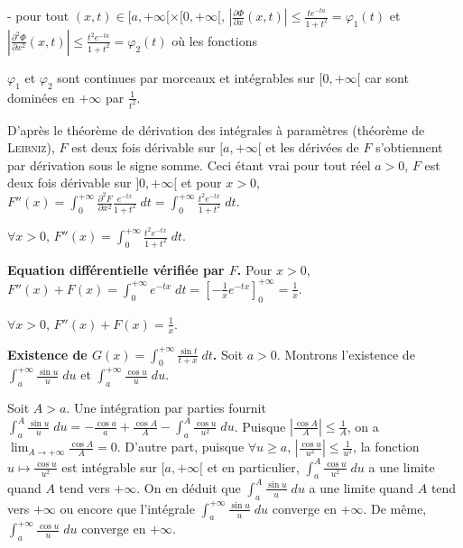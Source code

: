 {{- pour tout $(x,t)\in[a,+\infty[\times[0,+\infty[$, $\left| \frac{\partial \Phi}{\partial x}(x,t)\right|\leqslant \frac{te^{-ta}}{1+t^2}=\varphi_1(t)$ et  $\left| \frac{\partial^2\Phi}{\partial x^2}(x,t)\right|\leqslant \frac{t^2e^{-ta}}{1+t^2}=\varphi_2(t)$ où les fonctions 

$\varphi_1$ et $\varphi_2$ sont continues par morceaux et intégrables sur $[0,+\infty[$ car sont dominées en $+\infty$ par $ \frac{1}{t^2}$.
 
 
 

 
 
D'après le théorème de dérivation des intégrales à paramètres (théorème de \textsc{Leibniz}), $F$ est deux fois dérivable sur $[a,+\infty[$ et les dérivées de $F$ s'obtiennent par dérivation sous le signe somme. Ceci étant vrai pour tout réel $a>0$, $F$ est deux fois dérivable sur $]0,+\infty[$ et pour $x>0$, $F''(x)=\int_{0}^{+\infty} \frac{\partial^2F}{\partial x^2} \frac{e^{-tx}}{1+t^2}\;dt=\int_{0}^{+\infty} \frac{t^2e^{-tx}}{1+t^2}\;dt$.

\begin{center}
$\forall x>0$, $F''(x)=\int_{0}^{+\infty} \frac{t^2e^{-tx}}{1+t^2}\;dt$.
\end{center}

\textbf{Equation différentielle vérifiée par $F$.} Pour $x>0$, $F''(x)+F(x)=\int_{0}^{+\infty}e^{-tx}\;dt=\left[- \frac{1}{x}e^{-tx}\right]_0^{+\infty}= \frac{1}{x}$.

\begin{center}
$\forall x>0$, $F''(x)+F(x)= \frac{1}{x}$.
\end{center}

\textbf{Existence de $G(x)=\int_{0}^{+\infty} \frac{\sin t}{t+x}\;dt$.} Soit $a>0$. Montrons l'existence de $\int_{a}^{+\infty} \frac{\sin u}{u}\;du$ et $\int_{a}^{+\infty} \frac{\cos u}{u}\;du$.

Soit $A>a$. Une intégration par parties fournit $\int_{a}^{A} \frac{\sin u}{u}\;du=- \frac{\cos a}{a}+ \frac{\cos A}{A}-\int_{a}^{A} \frac{\cos u}{u^2}\;du$. Puisque $\left| \frac{\cos A}{A}\right|\leqslant \frac{1}{A}$, on a $\lim_{A \rightarrow +\infty} \frac{\cos A}{A}=0$. D'autre part, puisque $\forall u\geqslant a$, $\left| \frac{\cos u}{u^2}\right|\leqslant \frac{1}{u^2}$, la fonction $u\mapsto \frac{\cos u}{u^2}$ est intégrable sur $[a,+\infty[$ et en particulier, $\int_{a}^{A} \frac{\cos u}{u^2}\;du$ a une limite quand $A$ tend vers $+\infty$. On en déduit que $\int_{a}^{A} \frac{\sin u}{u}\;du$ a une limite quand $A$ tend vers $+\infty$ ou encore que l'intégrale $\int_{a}^{+\infty} \frac{\sin u}{u}\;du$ converge en $+\infty$. De même, $\int_{a}^{+\infty} \frac{\cos u}{u}\;du$ converge en $+\infty$. 

}}
